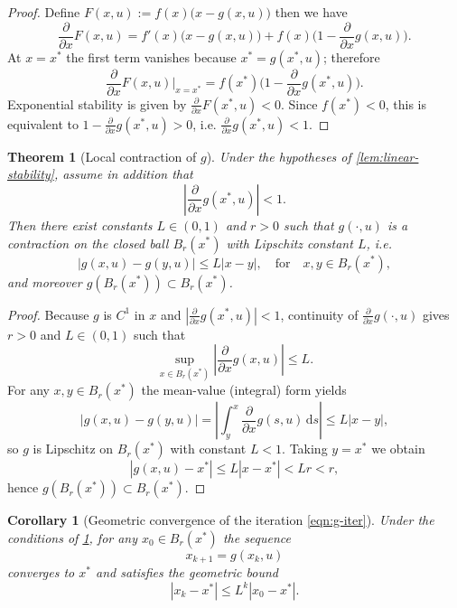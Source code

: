 \documentclass[11pt,twoside]{article}
\theoremstyle{plain}
\newtheorem{theorem}{Theorem}
\newtheorem{corollary}{Corollary}
\theoremstyle{definition}
\theoremstyle{remark}
\begin{document}
\begin{proof}
Define \(F(x,u) := f(x)\bigl(x-g(x,u)\bigr)\) then we have
\[
    \frac{\partial}{\partial x} F(x,u) = f'(x)\bigl(x-g(x,u)\bigr) + f(x)\bigl(1-\frac{\partial}{\partial x} g(x,u)\bigr).
\]
At \(x=x^*\) the first term vanishes because \(x^*=g(x^*,u)\); therefore
\[
    \frac{\partial}{\partial x} F(x,u)\big|_{x=x^*} = f(x^*)\bigl(1-\frac{\partial}{\partial x} g(x^*,u)\bigr).
\]
Exponential stability is given by \(\frac{\partial}{\partial x} F(x^*,u)<0\). Since \(f(x^*)<0\), this is equivalent to \(1-\frac{\partial}{\partial x} g(x^*,u)>0\), i.e. \(\frac{\partial}{\partial x} g(x^*,u)<1\). 
\end{proof}

\begin{theorem}[Local contraction of \(g\)]\label{thm:local-contraction}
Under the hypotheses of \cref{lem:linear-stability}, assume in addition that
\[
    \left|\frac{\partial}{\partial x} g(x^*,u)\right| < 1.
\]
Then there exist constants \(L\in(0,1)\) and \(r>0\) such that \(g(\cdot,u)\) is a contraction on the closed ball \(B_r(x^*)\) with Lipschitz constant \(L\), i.e.
\[
    |g(x,u) - g(y,u)| \le L |x-y|, \quad \text{for}\quad x,y\in B_r(x^*),
\]
and moreover \(g(B_r(x^*))\subset B_r(x^*)\).
\end{theorem}

\begin{proof}
Because \(g\) is \(C^1\) in \(x\) and \(|\frac{\partial}{\partial x} g(x^*,u)|<1\), continuity of \(\frac{\partial}{\partial x} g(\cdot,u)\) gives \(r>0\) and \(L\in(0,1)\) such that
\[
    \sup_{x\in B_r(x^*)} \left|\frac{\partial}{\partial x} g(x,u)\right| \le L.
\]
For any \(x,y\in B_r(x^*)\) the mean-value (integral) form yields
\[
    |g(x,u)-g(y,u)| = \left|\int_y^x \frac{\partial}{\partial x} g(s,u)\,\mathrm{d}s\right| \le L|x-y|,
\]
so \(g\) is Lipschitz on \(B_r(x^*)\) with constant \(L<1\). Taking \(y=x^*\) we obtain
\[
    |g(x,u)-x^*| \le L|x-x^*| < Lr < r,
\]
hence \(g(B_r(x^*))\subset B_r(x^*)\).
\end{proof}

\begin{corollary}[Geometric convergence of the iteration \cref{eqn:g-iter}]\label{cor:geometric}
Under the conditions of \cref{thm:local-contraction}, for any \(x_0\in B_r(x^*)\) the sequence
\[
    x_{k+1} = g(x_k,u)
\]
converges to \(x^*\) and satisfies the geometric bound
\[
    |x_k - x^*| \le L^k |x_0 - x^*|.
\]
\end{corollary}
\end{document}
